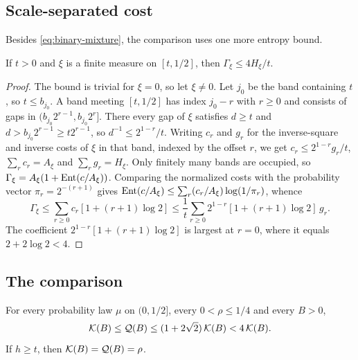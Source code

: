 \subsection{Scale-separated cost}
Besides \eqref{eq:binary-mixture}, the comparison uses one more entropy
bound.

\begin{lemma}\label{lem:scale-separated}
If $t>0$ and $\xi$ is a finite measure on $[t,1/2]$, then
$\Gamma_\xi\le4H_\xi/t$.
\end{lemma}

\begin{proof}
The bound is trivial for $\xi=0$, so let $\xi\ne0$. Let $j_0$ be the
band containing $t$, so $t\le b_{j_0}$. A band
meeting $[t,1/2]$ has index $j_0-r$ with $r\ge0$ and consists of gaps
in $(b_{j_0}2^{r-1},b_{j_0}2^r]$. There every gap of $\xi$ satisfies
$d\ge t$ and $d>b_{j_0}2^{r-1}\ge t2^{r-1}$, so $d^{-1}\le2^{1-r}/t$.
Writing $c_r$ and $g_r$ for the inverse-square and inverse costs of
$\xi$ in that band, indexed by the offset $r$, we get
$c_r\le2^{1-r}g_r/t$, $\sum_rc_r=A_\xi$ and $\sum_rg_r=H_\xi$. Only
finitely many bands are occupied, so
$\Gamma_\xi=A_\xi(1+\operatorname{Ent}(c/A_\xi))$. Comparing the normalized costs
with the probability vector $\pi_r=2^{-(r+1)}$ gives
$\operatorname{Ent}(c/A_\xi)\le\sum_r(c_r/A_\xi)\log(1/\pi_r)$, whence
\[
 \Gamma_\xi\le\sum_{r\ge0}c_r[1+(r+1)\log2]
 \le\frac1t\sum_{r\ge0}2^{1-r}[1+(r+1)\log2]\,g_r.
\]
The coefficient $2^{1-r}[1+(r+1)\log2]$ is largest at $r=0$, where it
equals $2+2\log2<4$.
\end{proof}

\subsection{The comparison}
\begin{proposition}\label{prop:quantile-selection}
For every probability law $\mu$ on $(0,1/2]$, every $0<\rho\le1/4$ and
every $B>0$,
\[
 \mathcal K(B)\le\mathcal Q(B)\le(1+2\sqrt2)\,\mathcal K(B)<4\,\mathcal K(B).
\]
If $h\ge t$, then $\mathcal K(B)=\mathcal Q(B)=\rho$.
\end{proposition}

